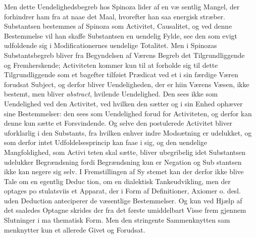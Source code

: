 \documentclass[12pt,a4paper]{book}
\begin{document}
Men dette Uendelighedsbegreb hos Spinoza lider af en væ\-%
sentlig Mangel, der forhindrer ham fra at naae det Maal, hvorefter
han saa energisk stræber. Substantsen bestemmes af Spinoza som
Activitet, Causalitet, og ved denne Bestemmelse vil han skaffe
Substantsen en uendelig Fylde, see den som evigt udfoldende
sig i Modificationernes uendelige Totalitet. Men i Spinozas
Substantsbegreb bliver fra Begyndelsen af Værens Begreb det
Tilgrundliggende og Fremherskende; Activiteten kommer kun
til at forholde sig til dette Tilgrundliggende som et bagefter
tilføiet Prædicat ved et i sin færdige Væren forudsat Subject,
og derfor bliver Uendeligheden, der er hiin Værens Væsen,
ikke bestemt, men bliver \emph{abstract}, hvilende Uendelighed.
Den sees ikke som Uendelighed ved den Activitet, ved hvilken
den sætter og i sin Enhed ophæver sine Bestemmelser: den
sees som Uendelighed forud for Activiteten, og derfor kan denne
kun sætte et Forsvindende. Og selve den postulerede Activitet
bliver uforklarlig i den Substants, fra hvilken enhver indre
Modsætning er udelukket, og som derfor intet Udfoldelsesprincip
kan faae i sig, og den uendelige Mangfoldighed, som Activi\-%
teten skal sætte, bliver ubegribelig idet Substantsen udelukker
Begrændsning fordi Begrændsning kun er Negation og Sub\-%
stantsen ikke kan negere sig selv. I Fremstillingen af Sy\-%
stemet kan der derfor ikke blive Tale om en egentlig Deduc\-%
tion, om en dialektisk Tankeudvikling, men der optages po\-%
stulatsviis et Apparat, der i Form af Definitioner, Axiomer
o. desl. uden Deduction anteciperer de væsentlige Bestemmelser.
Og kun ved Hjælp af det saaledes Optagne skrides der fra
det første umiddelbart Visse frem gjennem Slutninger i ma\-%
thematisk Form. Men den stringente Sammenknytten sam\-%
menknytter kun et allerede Givet og Forudsat.
\end{document}
